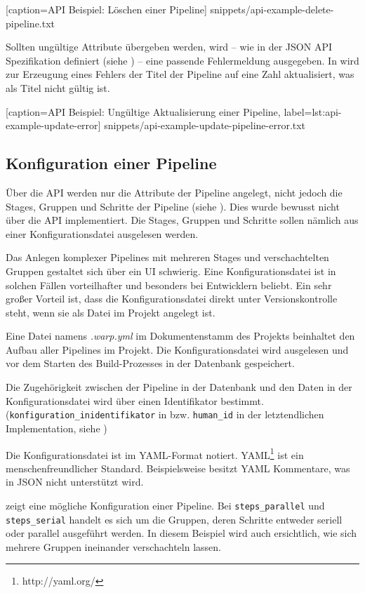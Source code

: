 
  [caption={API Beispiel: Löschen einer Pipeline}]
  {snippets/api-example-delete-pipeline.txt}

Sollten ungültige Attribute übergeben werden, wird – wie in der JSON API Spezifikation definiert (siehe ) – eine passende Fehlermeldung ausgegeben. In  wird zur Erzeugung eines Fehlers der Titel der Pipeline auf eine Zahl aktualisiert, was als Titel nicht gültig ist.


  [caption={API Beispiel: Ungültige Aktualisierung einer Pipeline},
  label={lst:api-example-update-error}]
  {snippets/api-example-update-pipeline-error.txt}


\subsection{Konfiguration einer Pipeline}

Über die API werden nur die Attribute der Pipeline angelegt, nicht jedoch die Stages, Gruppen und Schritte der Pipeline (siehe ). Dies wurde bewusst nicht über die API implementiert. Die Stages, Gruppen und Schritte sollen nämlich aus einer Konfigurationsdatei ausgelesen werden.

Das Anlegen komplexer Pipelines mit mehreren Stages und verschachtelten Gruppen gestaltet sich über ein \acf{UI} schwierig. Eine Konfigurationsdatei ist in solchen Fällen vorteilhafter und besonders bei Entwicklern beliebt. Ein sehr großer Vorteil ist, dass die Konfigurationsdatei direkt unter Versionskontrolle steht, wenn sie als Datei im Projekt angelegt ist.

Eine Datei namens \emph{.warp.yml} im Dokumentenstamm des Projekts beinhaltet den Aufbau aller Pipelines im Projekt. Die Konfigurationsdatei wird ausgelesen und vor dem Starten des Build-Prozesses in der Datenbank gespeichert.

Die Zugehörigkeit zwischen der Pipeline in der Datenbank und den Daten in der Konfigurationsdatei wird über einen Identifikator bestimmt. (\texttt{konfiguration\_\allowbreak inidentifikator} in  bzw. \texttt{human\_id} in der letztendlichen Implementation, siehe )

Die Konfigurationsdatei ist im YAML-Format notiert. YAML\footnote{http://yaml.org/} ist ein menschenfreundlicher Standard. Beispielsweise besitzt YAML Kommentare, was in JSON nicht unterstützt wird.

 zeigt eine mögliche Konfiguration einer Pipeline. Bei \texttt{steps\_\allowbreak parallel} und \texttt{steps\_\allowbreak serial} handelt es sich um die Gruppen, deren Schritte entweder seriell oder parallel ausgeführt werden. In diesem Beispiel wird auch ersichtlich, wie sich mehrere Gruppen ineinander verschachteln lassen.

